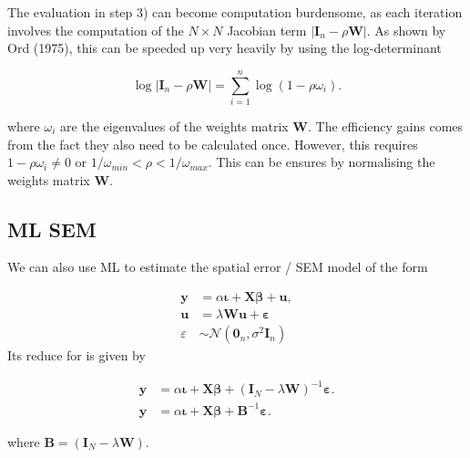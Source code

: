 \documentclass[
  letterpaper,
]{scrbook}
\begin{document}
The evaluation in step 3) can become computation burdensome, as each
iteration involves the computation of the \(N \times N\) Jacobian term
\(\left|\boldsymbol{\mathbf{I}}_n - \rho\boldsymbol{\mathbf{W}}\right|\).
As shown by Ord (1975), this can be speeded up very heavily by using the
log-determinant

\[
\log\left|\boldsymbol{\mathbf{I}}_n -\rho\boldsymbol{\mathbf{W}}\right|=\sum_{i=1}^n\log(1 - \rho\omega_i).
\]

where \(\omega_i\) are the eigenvalues of the weights matrix
\(\boldsymbol{\mathbf{W}}\). The efficiency gains comes from the fact
they also need to be calculated once. However, this requires
\(1 - \rho \omega_i \neq 0\) or
\(1/\omega_{min} < \rho < 1/\omega_{max}\). This can be ensures by
normalising the weights matrix \(\boldsymbol{\mathbf{W}}\).

\hypertarget{ml-sem}{%
\subsection{ML SEM}\label{ml-sem}}

We can also use ML to estimate the spatial error / SEM model of the form

\[
        \begin{split}
        {\boldsymbol{\mathbf{y}}}&=\alpha{\boldsymbol{\mathbf{\iota}}}+{\boldsymbol{\mathbf{X}}}{\boldsymbol{\mathbf{\beta}}}+{\boldsymbol{\mathbf{u}}},\\
        {\boldsymbol{\mathbf{u}}}&=\lambda{\boldsymbol{\mathbf{W}}}{\boldsymbol{\mathbf{u}}}+{\boldsymbol{\mathbf{\varepsilon}}}\\
        \varepsilon  &\sim \mathcal{N}(\boldsymbol{\mathbf{0}}_n , \sigma^2\boldsymbol{\mathbf{I}}_n)
        \end{split} 
\] Its reduce for is given by

\[
        \begin{split}
        {\boldsymbol{\mathbf{y}}}&=\alpha{\boldsymbol{\mathbf{\iota}}}+{\boldsymbol{\mathbf{X}}}{\boldsymbol{\mathbf{\beta}}}+({\boldsymbol{\mathbf{I}}_N}-\lambda {\boldsymbol{\mathbf{W}}})^{-1}{\boldsymbol{\mathbf{\varepsilon}}}.\\
        {\boldsymbol{\mathbf{y}}}&=\alpha{\boldsymbol{\mathbf{\iota}}}+{\boldsymbol{\mathbf{X}}}{\boldsymbol{\mathbf{\beta}}}+\boldsymbol{\mathbf{B}}^{-1}{\boldsymbol{\mathbf{\varepsilon}}}.
        \end{split} 
\]

where
\(\boldsymbol{\mathbf{B}} = ({\boldsymbol{\mathbf{I}}_N}-\lambda {\boldsymbol{\mathbf{W}}})\).
\end{document}
